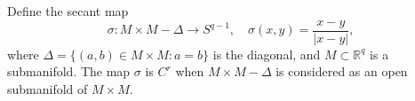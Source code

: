 Define the secant map
$$\sigma: M \times M - \Delta \to S^{q-1}, \quad \sigma(x,y) = \frac{x - y}{|x - y|},$$
where $\Delta = \{(a,b) \in M \times M : a = b\}$ is the diagonal, and $M \subset \mathbb{R}^q$ is a submanifold. The map $\sigma$ is $C^r$ when $M \times M - \Delta$ is considered as an open submanifold of $M \times M$.
